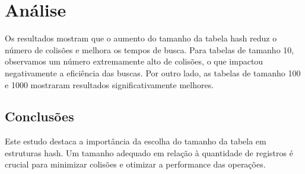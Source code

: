 \documentclass[a4paper,11pt]{article}
\begin{document}
\section{Análise}
Os resultados mostram que o aumento do tamanho da tabela hash reduz o número de colisões e melhora os tempos de busca. Para tabelas de tamanho 10, observamos um número extremamente alto de colisões, o que impactou negativamente a eficiência das buscas. Por outro lado, as tabelas de tamanho 100 e 1000 mostraram resultados significativamente melhores.

\subsection{Conclusões}
Este estudo destaca a importância da escolha do tamanho da tabela em estruturas hash. Um tamanho adequado em relação à quantidade de registros é crucial para minimizar colisões e otimizar a performance das operações.
\end{document}
